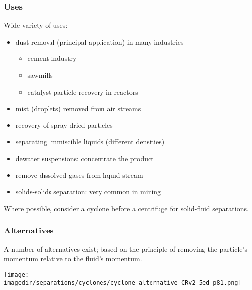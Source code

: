 \begin{frame}\frametitle{Uses}
	Wide variety of uses:
	\begin{itemize}
		\item	dust removal (principal application) in many industries
			\begin{itemize}
				\item	cement industry
				\item	sawmills
				\item	catalyst particle recovery in reactors
			\end{itemize}
		\item	mist (droplets) removed from air streams
		\item	recovery of spray-dried particles
		\item	separating immiscible liquids (different densities)
		\item	dewater suspensions: concentrate the product
		\item	remove dissolved gases from liquid stream
		\item	solids-solids separation: very common in mining
	\end{itemize}

	\vspace{12pt}
	\begin{exampleblock}{}
		Where possible, consider a cyclone before a centrifuge for solid-fluid separations.
	\end{exampleblock}
\end{frame}

\begin{frame}\frametitle{Alternatives}
	A number of alternatives exist; based on the principle of removing the particle's momentum relative to the fluid's momentum. {\color{myBlue}{Other options?}}

	\begin{center}
		\texttt{[image: \\imagedir/separations/cyclones/cyclone-alternative-CRv2-5ed-p81.png]}
	\end{center}
\end{frame}

%
%


